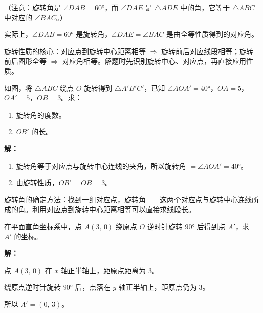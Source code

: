 \documentclass[12pt, a4paper]{ctexart}
\begin{document}
（注意：旋转角是 $\angle DAB = 60°$，而 $\angle DAE$ 是 $\triangle ADE$ 中的角，它等于 $\triangle ABC$ 中对应的 $\angle BAC$。）

实际上，$\angle DAB = 60°$ 是旋转角，$\angle DAE = \angle BAC$ 是由全等性质得到的对应角。

\begin{tipbox}[方法总结]
旋转性质的核心：对应点到旋转中心距离相等 $\Rightarrow$ 旋转前后对应线段相等；旋转前后图形全等 $\Rightarrow$ 对应角相等。解题时先识别旋转中心、对应点，再直接应用性质。
\end{tipbox}

\vspace{6pt}

\begin{examplebox}[【例题2】求旋转角]
如图，将 $\triangle ABC$ 绕点 $O$ 旋转得到 $\triangle A'B'C'$，已知 $\angle AOA' = 40°$，$OA = 5$，$OA' = 5$，$OB = 3$。求：
\begin{enumerate}[label=(\arabic*)]
  \item 旋转角的度数。
  \item $OB'$ 的长。
\end{enumerate}
\end{examplebox}

\textbf{解：}
\begin{enumerate}[label=(\arabic*)]
  \item 旋转角等于对应点与旋转中心连线的夹角，所以旋转角 $= \angle AOA' = 40°$。
  \item 由旋转性质，$OB' = OB = 3$。
\end{enumerate}

\begin{tipbox}[方法总结]
旋转角的确定方法：找到一组对应点，旋转角 $=$ 这两个对应点与旋转中心连线所成的角。利用对应点到旋转中心距离相等可以直接求线段长。
\end{tipbox}

\vspace{6pt}

\begin{examplebox}[【例题3】坐标系中的旋转]
在平面直角坐标系中，点 $A(3,\, 0)$ 绕原点 $O$ 逆时针旋转 $90°$ 后得到点 $A'$，求 $A'$ 的坐标。
\end{examplebox}

\textbf{解：}

点 $A(3,\, 0)$ 在 $x$ 轴正半轴上，距原点距离为 $3$。

绕原点逆时针旋转 $90°$ 后，点落在 $y$ 轴正半轴上，距原点仍为 $3$。

所以 $A' = (0,\, 3)$。
\end{document}
